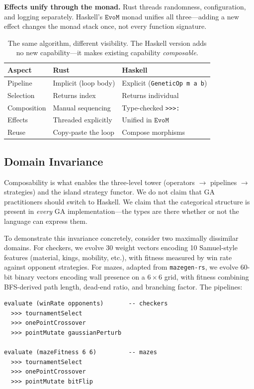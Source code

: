 \documentclass[dvipsnames,format=sigconf,anonymous=true,review=false]{acmart}
\newcommand{\EvoM}{\texttt{EvoM}}
\begin{document}
\textbf{Effects unify through the monad.} Rust threads randomness, configuration, and logging separately. Haskell's $\EvoM$ monad unifies all three---adding a new effect changes the monad stack once, not every function signature.

\begin{table}[ht]
\centering
\caption{The same algorithm, different visibility. The Haskell version adds no new capability---it makes existing capability \emph{composable}.}
\label{tab:rust-haskell}
\small
\begin{tabular}{@{}lll@{}}
\toprule
\textbf{Aspect} & \textbf{Rust} & \textbf{Haskell} \\
\midrule
Pipeline    & Implicit (loop body)      & Explicit (\texttt{GeneticOp m a b}) \\
Selection   & Returns index             & Returns individual \\
Composition & Manual sequencing         & Type-checked \texttt{>{>}{>}:} \\
Effects     & Threaded explicitly       & Unified in $\EvoM$ \\
Reuse       & Copy-paste the loop       & Compose morphisms \\
\bottomrule
\end{tabular}
\end{table}

\subsection{Domain Invariance}

Composability is what enables the three-level tower (operators $\to$ pipelines $\to$ strategies) and the island strategy functor. We do not claim that GA practitioners should switch to Haskell. We claim that the categorical structure is present in \emph{every} GA implementation---the types are there whether or not the language can express them.

To demonstrate this invariance concretely, consider two maximally dissimilar domains. For checkers, we evolve 30 weight vectors encoding 10 Samuel-style features (material, kings, mobility, etc.), with fitness measured by win rate against opponent strategies. For mazes, adapted from \texttt{mazegen-rs}, we evolve 60-bit binary vectors encoding wall presence on a $6 \times 6$ grid, with fitness combining BFS-derived path length, dead-end ratio, and branching factor. The pipelines:

\begin{lstlisting}[style=plainstyle]
evaluate (winRate opponents)       -- checkers
  >>> tournamentSelect
  >>> onePointCrossover
  >>> pointMutate gaussianPerturb

evaluate (mazeFitness 6 6)         -- mazes
  >>> tournamentSelect
  >>> onePointCrossover
  >>> pointMutate bitFlip
\end{lstlisting}
\end{document}
